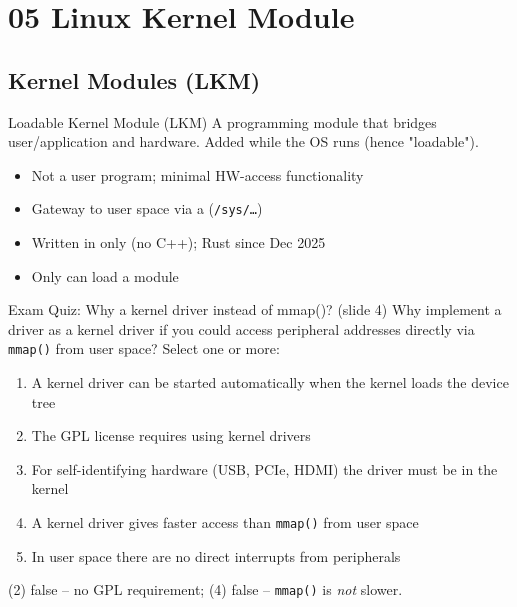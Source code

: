 \section{05 Linux Kernel Module}

\subsection{Kernel Modules (LKM)}


\begin{concept}{Loadable Kernel Module (LKM)}
    A programming module that bridges user/application and hardware. Added
     while the OS runs (hence "loadable").
    \begin{itemize}
        \item Not a user program; minimal HW-access functionality
        \item Gateway to user space via a  (\texttt{/sys/\dots})
        \item Written in  only (no C++); Rust since Dec 2025
        \item Only  can load a module
    \end{itemize}
\end{concept}

\begin{example2}{Exam Quiz: Why a kernel driver instead of mmap()? (slide 4)}
    Why implement a driver as a kernel driver if you could access peripheral
    addresses directly via \texttt{mmap()} from user space? Select one or more:
    \begin{enumerate}
        \item A kernel driver can be started automatically when the kernel loads
              the device tree
        \item The GPL license requires using kernel drivers
        \item For self-identifying hardware (USB, PCIe, HDMI) the driver must be in
              the kernel
        \item A kernel driver gives faster access than \texttt{mmap()} from user space
        \item In user space there are no direct interrupts from peripherals
    \end{enumerate}
    \tcblower
    (2) false -- no GPL requirement; (4) false -- \texttt{mmap()} is \emph{not} slower.
\end{example2}

